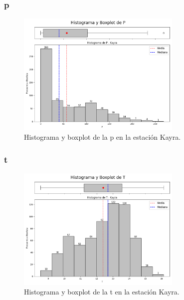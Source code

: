 \subsubsection*{\gls{p} }
\begin{figure}[htbp]
\centering
\includegraphics[width=0.7\textwidth]{resultados/por_estacion_meteorologica/Kayra/P_histograma.png}
\caption{Histograma y boxplot de la \gls{p}  en la estación Kayra.}
\label{fig:kayra_P}
\end{figure}

\subsubsection*{\gls{t} }
\begin{figure}[htbp]
\centering
\includegraphics[width=0.7\textwidth]{resultados/por_estacion_meteorologica/Kayra/T_histograma.png}
\caption{Histograma y boxplot de la \gls{t}  en la estación Kayra.}
\label{fig:kayra_T}
\end{figure}

